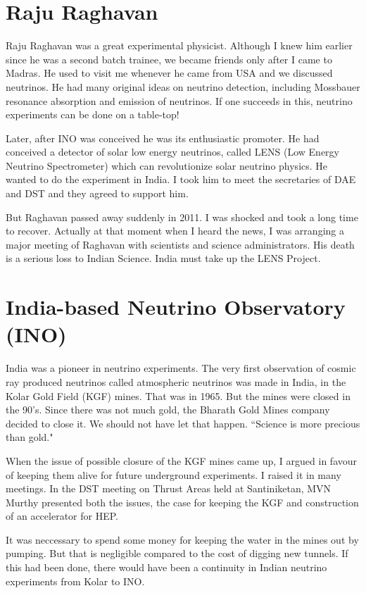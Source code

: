 \section*{Raju Raghavan}

Raju Raghavan was a great experimental physicist. Although I knew him 
earlier since he was a second batch trainee, we became friends only 
after I came to Madras. He used to visit me whenever he came from USA 
and we discussed neutrinos. He had many original ideas on neutrino 
detection, including Mossbauer resonance absorption and emission of 
neutrinos. If one succeeds in this, neutrino experiments can be done on 
a table-top!
 
Later, after INO was conceived he was its enthusiastic promoter. He had 
conceived a detector of solar low energy neutrinos, called LENS (Low 
Energy Neutrino Spectrometer) which can revolutionize solar neutrino 
physics. He wanted to do the experiment in India. I took him to meet the 
secretaries of DAE and DST and they agreed to support him.

But Raghavan passed away suddenly in 2011. I was shocked and took a long 
time to recover. Actually at that moment when I heard the news, I was 
arranging a major meeting of Raghavan with scientists and science 
administrators. His death is a serious loss to Indian Science. India 
must take up the LENS Project.

\section*{India-based Neutrino Observatory (INO)}

India was a pioneer in neutrino experiments. The very first observation 
of cosmic ray produced neutrinos called atmospheric neutrinos was made 
in India, in the Kolar Gold Field (KGF) mines. That was in 1965. But the 
mines were closed in the 90's. Since there was not much gold, the 
Bharath Gold Mines company decided to close it. We should not have let 
that happen. ``Science is more precious than gold."
\medskip

When the issue of possible closure of the KGF mines came up, I argued in 
favour of keeping them alive for future underground experiments. I 
raised it in many meetings. In the DST meeting on Thrust Areas held at 
Santiniketan, MVN Murthy presented both the issues, the case for keeping 
the KGF and construction of an accelerator for HEP.
\medskip

It was neccessary to spend some money for keeping the water in the mines 
out by pumping. But that is negligible compared to the cost of digging 
new tunnels. If this had been done, there would have been a continuity 
in Indian neutrino experiments from Kolar to INO.
\medskip

